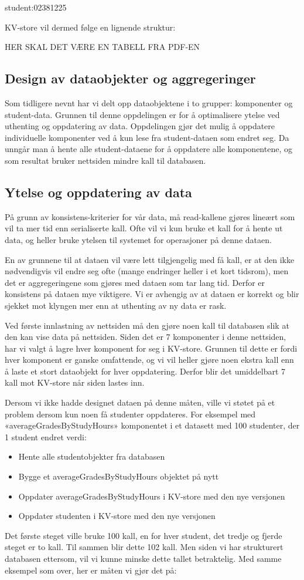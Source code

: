   student:02381225

KV-store vil dermed følge en lignende struktur:

HER SKAL DET VÆRE EN TABELL FRA PDF-EN

\subsection{Design av dataobjekter og aggregeringer}
Som tidligere nevnt har vi delt opp dataobjektene i to grupper: komponenter og student-data. Grunnen til denne oppdelingen er for å optimalisere ytelse ved uthenting og oppdatering av data. Oppdelingen gjør det mulig å oppdatere individuelle komponenter ved å kun lese fra student-dataen som endret seg. Da unngår man å hente alle student-dataene for å oppdatere alle komponentene, og som resultat bruker nettsiden mindre kall til databasen.

\subsection{Ytelse og oppdatering av data}
På grunn av konsistens-kriterier for vår data, må read-kallene gjøres lineært som vil ta mer tid enn serialiserte kall. Ofte vil vi kun bruke et kall for å hente ut data, og heller bruke ytelsen til systemet for operasjoner på denne dataen.

En av grunnene til at dataen vil være lett tilgjengelig med få kall, er at den ikke nødvendigvis vil endre seg ofte (mange endringer heller i et kort tidsrom), men det er aggregeringene som gjøres med dataen som tar lang tid. Derfor er konsistens på dataen mye viktigere. Vi er avhengig av at dataen er korrekt og blir sjekket mot klyngen mer enn at uthenting av ny data er rask.

Ved første innlastning av nettsiden må den gjøre noen kall til databasen slik at den kan vise data på nettsiden. Siden det er 7 komponenter i denne nettsiden, har vi valgt å lagre hver komponent for seg i KV-store. Grunnen til dette er fordi hver komponent er ganske omfattende, og vi vil heller gjøre noen ekstra kall enn å laste et stort dataobjekt for hver oppdatering. Derfor blir det umiddelbart 7 kall mot KV-store når siden lastes inn.

Dersom vi ikke hadde designet dataen på denne måten, ville vi støtet på et problem dersom kun noen få studenter oppdateres. For eksempel med «averageGradesByStudyHours» komponentet i et datasett med 100 studenter, der 1 student endret verdi:

\begin{itemize}
  \item Hente alle studentobjekter fra databasen
  \item Bygge et averageGradesByStudyHours objektet på nytt
  \item Oppdater averageGradesByStudyHours i KV-store med den nye versjonen
  \item Oppdater studenten i KV-store med den nye versjonen
\end{itemize}

Det første steget ville bruke 100 kall, en for hver student, det tredje og fjerde steget er to kall. Til sammen blir dette 102 kall. Men siden vi har strukturert databasen ettersom, vil vi kunne minske dette tallet betraktelig. Med samme eksempel som over, her er måten vi gjør det på:
